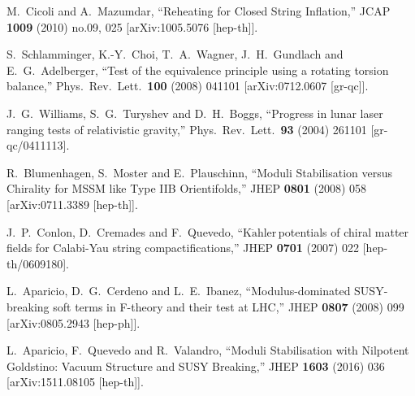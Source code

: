\documentclass[11pt,a4paper]{article}
\newcommand{\Kahler}{\ensuremath{\text{K}\ddot{\text{a}}\text{hler}\,}}
\begin{document}
\begin{thebibliography}{99}
  M.~Cicoli and A.~Mazumdar,
  ``Reheating for Closed String Inflation,''
  JCAP {\bf 1009} (2010) no.09,  025
  [arXiv:1005.5076 [hep-th]].


  S.~Schlamminger, K.-Y.~Choi, T.~A.~Wagner, J.~H.~Gundlach and E.~G.~Adelberger,
  ``Test of the equivalence principle using a rotating torsion balance,''
  Phys.\ Rev.\ Lett.\  {\bf 100} (2008) 041101
  [arXiv:0712.0607 [gr-qc]].


  J.~G.~Williams, S.~G.~Turyshev and D.~H.~Boggs,
  ``Progress in lunar laser ranging tests of relativistic gravity,''
  Phys.\ Rev.\ Lett.\  {\bf 93} (2004) 261101
  [gr-qc/0411113].


  R.~Blumenhagen, S.~Moster and E.~Plauschinn,
  ``Moduli Stabilisation versus Chirality for MSSM like Type IIB Orientifolds,''
  JHEP {\bf 0801} (2008) 058
  [arXiv:0711.3389 [hep-th]].


  J.~P.~Conlon, D.~Cremades and F.~Quevedo,
  ``\Kahler potentials of chiral matter fields for Calabi-Yau string compactifications,''
  JHEP {\bf 0701} (2007) 022
  [hep-th/0609180].


  L.~Aparicio, D.~G.~Cerdeno and L.~E.~Ibanez,
  ``Modulus-dominated SUSY-breaking soft terms in F-theory and their test at LHC,''
  JHEP {\bf 0807} (2008) 099
  [arXiv:0805.2943 [hep-ph]].


  L.~Aparicio, F.~Quevedo and R.~Valandro,
  ``Moduli Stabilisation with Nilpotent Goldstino: Vacuum Structure and SUSY Breaking,''
  JHEP {\bf 1603} (2016) 036
  [arXiv:1511.08105 [hep-th]].



\end{thebibliography}
\end{document}
